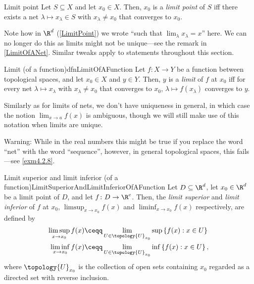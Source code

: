 \begin{dfn}{Limit point}{}
Let $S\subseteq X$ and let $x_0\in X$.  Then, $x_0$ is a \emph{limit point} of $S$ iff there exists a net $\lambda \mapsto x_\lambda \in S$ with $x_\lambda \neq x_0$ that converges to $x_0$.
\begin{rmk}
Note how in $\R ^d$ (\cref{LimitPoint}) we wrote ``such that $\lim _{\lambda}x_{\lambda}=x$'' here.  We can no longer do this as limits might not be unique---see the remark in \cref{LimitOfANet}.  Similar tweaks apply to statements throughout this section.
\end{rmk}
\end{dfn}
\begin{dfn}{Limit (of a function)}{dfnLimitOfAFunction}
Let $f\colon X \rightarrow Y$ be a function between topological spaces, and let $x_0\in X$ and $y\in Y$.  Then, $y$ is a \emph{limit} of $f$ at $x_0$ iff for every net $\lambda \mapsto x_\lambda$ with $x_\lambda \neq x_0$ that converges to $x_0$, $\lambda \mapsto f(x_\lambda )$ converges to $y$.
\begin{rmk}
Similarly as for limits of nets, we don't have uniqueness in general, in which case the notion $\lim _{x\to a}f(x)$ is ambiguous, though we will still make use of this notation when limits are unique.
\end{rmk}
\begin{wrn}
Warning:  While in the real numbers this might be true if you replace the word ``net'' with the word ``sequence'', however, in general topological spaces, this fails---see \cref{exm4.2.8}.
\end{wrn}
\end{dfn}
\begin{dfn}{Limit superior and limit inferior (of a function)}{LimitSuperiorAndLimitInferiorOfAFunction}
Let $D\subseteq \R ^d$, let $x_0\in \R ^d$ be a limit point of $D$, and let $f\colon D\rightarrow \R ^e$.  Then, the \emph{limit superior} and \emph{limit inferior} of $f$ at $x_0$, $\limsup _{x\to x_0}f(x)$ and $\liminf _{x\to x_0}f(x)$ respectively, are defined by
\begin{subequations}
\begin{align}
\limsup _{x\to x_0}f(x) & \ceqq \lim _{U\in \topology{U}_{x_0}}\sup \left\{ f(x):x\in U\right\} \\
\liminf _{x\to x_0}f(x)& \ceqq \lim _{U\in \topology{U}_{x_0}}\inf \left\{ f(x):x\in U\right\} ,
\end{align}
\end{subequations}
where $\topology{U}_{x_0}$ is the collection of open sets containing $x_0$ regarded as a directed set with reverse inclusion.
\end{dfn}
